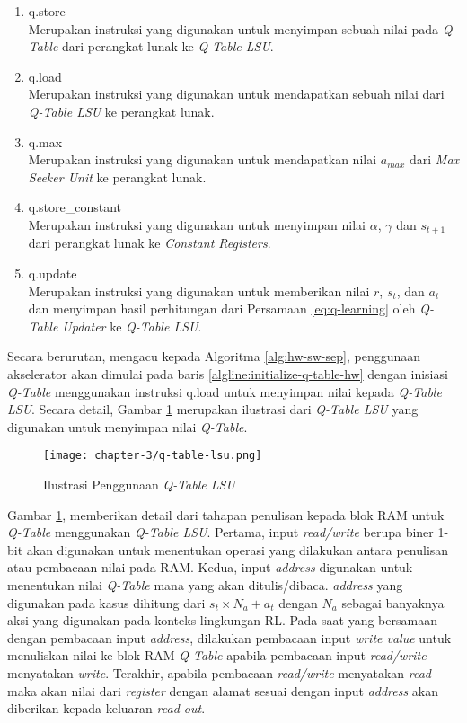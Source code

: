 \begin{enumerate}
	\item q.store\\
	      Merupakan instruksi yang digunakan untuk menyimpan sebuah nilai pada \textit{Q-Table} dari perangkat lunak ke \textit{Q-Table \ac{LSU}}.
	\item q.load\\
	      Merupakan instruksi yang digunakan untuk mendapatkan sebuah nilai dari \textit{Q-Table \ac{LSU}} ke perangkat lunak.
	\item q.max\\
	      Merupakan instruksi yang digunakan untuk mendapatkan nilai $a_{max}$ dari \textit{Max Seeker Unit} ke perangkat lunak.
	\item q.store\_constant\\
	      Merupakan instruksi yang digunakan untuk menyimpan nilai $\alpha$, $\gamma$ dan $s_{t+1}$ dari perangkat lunak ke \textit{Constant Registers}.
	\item q.update\\
	      Merupakan instruksi yang digunakan untuk memberikan nilai $r$, $s_t$, dan $a_t$ dan menyimpan hasil perhitungan dari Persamaan \ref{eq:q-learning} oleh \textit{Q-Table Updater} ke \textit{Q-Table \ac{LSU}}.
\end{enumerate}

Secara berurutan, mengacu kepada Algoritma \ref{alg:hw-sw-sep}, penggunaan akselerator akan dimulai pada baris \ref{algline:initialize-q-table-hw} dengan inisiasi \textit{Q-Table} menggunakan instruksi q.load untuk menyimpan nilai kepada \textit{Q-Table \ac{LSU}}. Secara detail, Gambar \ref{fig:q-table-lsu} merupakan ilustrasi dari \textit{Q-Table \ac{LSU}} yang digunakan untuk menyimpan nilai \textit{Q-Table}.

\begin{figure}[H]
	\centering
	\texttt{[image: chapter-3/q-table-lsu.png]}
	\caption{Ilustrasi Penggunaan \textit{Q-Table LSU}}
	\label{fig:q-table-lsu}
\end{figure}

Gambar \ref{fig:q-table-lsu}, memberikan detail dari tahapan penulisan kepada blok \ac{RAM} untuk \textit{Q-Table} menggunakan \textit{Q-Table \ac{LSU}}. Pertama, input \textit{read/write} berupa biner 1-bit akan digunakan untuk menentukan operasi yang dilakukan antara penulisan atau pembacaan nilai pada \ac{RAM}. Kedua, input \textit{address} digunakan untuk menentukan nilai \textit{Q-Table} mana yang akan ditulis/dibaca. \textit{address} yang digunakan pada kasus dihitung dari $s_t \times N_a + a_t$ dengan $N_a$ sebagai banyaknya aksi yang digunakan pada konteks lingkungan \ac{RL}. Pada saat yang bersamaan dengan pembacaan input \textit{address}, dilakukan pembacaan input \textit{write value} untuk menuliskan nilai ke blok \ac{RAM} \textit{Q-Table} apabila pembacaan input \textit{read/write} menyatakan \textit{write}. Terakhir, apabila pembacaan \textit{read/write} menyatakan \textit{read} maka akan nilai dari \textit{register} dengan alamat sesuai dengan input \textit{address} akan diberikan kepada keluaran \textit{read out}.

